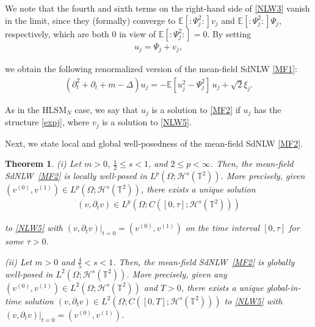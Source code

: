 \documentclass[letterpaper, 11pt,  reqno]{amsart}
\newtheorem{theorem}{Theorem}[section]
\newcommand{\1}{\hspace{0.5mm}\text{I}\hspace{0.2mm}}
\newcommand{\noi}{\noindent}
\newcommand{\T}{\mathbb{T}}
\newcommand{\E}{\mathbb{E}}
\renewcommand{\H}{\mathcal{H}}
\newcommand{\Dl}{\Delta}
\newcommand{\dt}{\partial_t}
\newcommand{\HLS}{$\text{HLSM}_N$ }
\newcommand{\wick}[1]{:\!{#1}\!:}
\renewcommand{\O}{\Omega}
\numberwithin{equation}{section}
\numberwithin{theorem}{section}
\begin{document}
\noi
We note that the fourth and sixth terms on the right-hand side
of \eqref{NLW3} vanish in the limit,
since they (formally)
converge
to 
$\E[ \wick{\Psi_j^2}] v_j $
and $\E[ \wick{\Psi_j^2}] \Psi_j$, respectively,
which are both $0$
in view of 
$\E[ \wick{\Psi_j^2}] = 0$.
By setting  
\begin{align}
    u_j = \Psi_j + v_j,
\label{expj}
\end{align}

\noi
we obtain  the following renormalized version of the mean-field SdNLW \eqref{MF1}:
\begin{align}
    (\dt^2 + \dt + m - \Dl) u_j = - \E [ u_j^2 - \Psi_j^2 ] \,u_j + \sqrt{2} \xi_j.
\label{MF2}
\end{align}

\noi
As in the \HLS case, 
we say that 
 $u_j$ is a solution to \eqref{MF2} if $u_j$ has the structure \eqref{expj}, 
 where $v_j$ is  a solution to \eqref{NLW5}.






Next, we state  local and global well-posedness 
of the  mean-field SdNLW \eqref{MF2}.

\begin{theorem} %
\label{THM:GWP2}
\textup{(i)} Let $m > 0$, $\frac 12 \le s < 1$, 
and $2 \le p < \infty$.
Then, 
the mean-field SdNLW~\eqref{MF2} is locally well-posed
in $L^p (\Omega; \H^s (\T^2) )$.
More precisely, 
given  
  $(v^{(0)}, v^{(1)}) \in L^p (\Omega; \H^s (\T^2) )$, 
there exists a unique solution 
\begin{align}
(v, \dt v) \in L^p(\O; C([0, \tau]; \H^s(\T^2)))
\label{class2}
\end{align}

\noi
to \eqref{NLW5}
with $(v, \dt v)|_{ t= 0} = (v^{(0)}, v^{(1)})$
on the time interval $[0, \tau]$ for some $\tau > 0$.



\medskip

\noi
\textup{(ii)}
Let $m > 0$ and $ \frac 45 < s < 1$.
Then, 
the mean-field SdNLW~\eqref{MF2} is globally well-posed
in $L^2 (\Omega; \H^s (\T^2) )$.
More precisely, 
given  any
  $(v^{(0)}, v^{(1)}) \in L^2 (\Omega; \H^s (\T^2) )$
and $T > 0$,   
there exists a unique global-in-time solution 
$(v, \dt v) \in L^2(\O; C([0, T]; \H^s(\T^2)))$
to \eqref{NLW5}
with $(v, \dt v)|_{ t= 0} = (v^{(0)}, v^{(1)})$.







\end{theorem}
\end{document}
